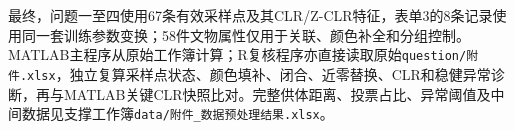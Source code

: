 最终，问题一至四使用67条有效采样点及其CLR/Z-CLR特征，表单3的8条记录使用同一套训练参数变换；58件文物属性仅用于关联、颜色补全和分组控制。MATLAB主程序从原始工作簿计算；R复核程序亦直接读取原始\texttt{question/附件.xlsx}，独立复算采样点状态、颜色填补、闭合、近零替换、CLR和稳健异常诊断，再与MATLAB关键CLR快照比对。完整供体距离、投票占比、异常阈值及中间数据见支撑工作簿\texttt{data/附件\_数据预处理结果.xlsx}。
